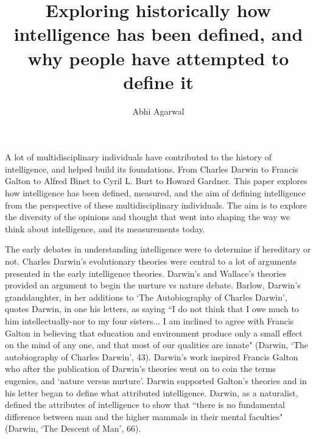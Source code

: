 \documentclass[12pt, oneside]{article}
\title{Exploring historically how intelligence has been defined, and why people have attempted to define it\vspace{-0.4cm}}
\author{Abhi Agarwal\vspace{-1cm}}
\date{}
\begin{document}
\maketitle


\par A lot of multidisciplinary individuals have contributed to the history of intelligence, and helped build its foundations. From Charles Darwin to Francis Galton to Alfred Binet to Cyril L. Burt to Howard Gardner. This paper explores how intelligence has been defined, measured, and the aim of defining intelligence from the perspective of these multidisciplinary individuals. The aim is to explore the diversity of the opinions and thought that went into shaping the way we think about intelligence, and its measurements today.



\par The early debates in understanding intelligence were to determine if hereditary or not. Charles Darwin's evolutionary theories were central to a lot of arguments presented in the early intelligence theories. Darwin's and Wallace's theories provided an argument to begin the nurture vs nature debate. Barlow, Darwin's granddaughter, in her additions to `The Autobiography of Charles Darwin', quotes Darwin, in one his letters, as saying ``I do not think that I owe much to him intellectually-nor to my four sisters... I am inclined to agree with Francis Galton in believing that education and environment produce only a small effect on the mind of any one, and that most of our qualities are innate" (Darwin, `The autobiography of Charles Darwin', 43). Darwin's work inspired Francis Galton who after the publication of Darwin's theories went on to coin the terms eugenics, and `nature versus nurture'. Darwin supported Galton's theories and in his letter began to define what attributed intelligence. Darwin, as a naturalist, defined the attributes of intelligence to show that ``there is no fundamental difference between man and the higher mammals in their mental faculties" (Darwin, `The Descent of Man', 66). 
\end{document}
